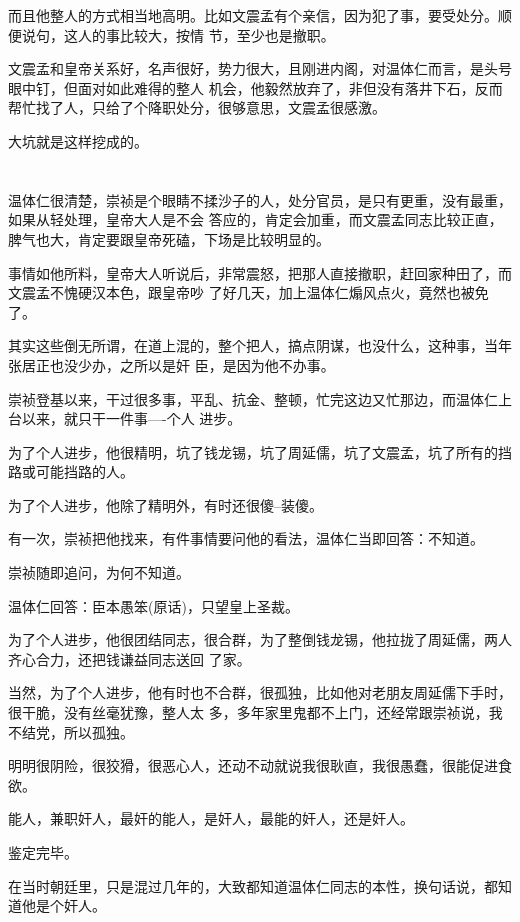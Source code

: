 \documentclass[11pt,a4paper,onecolumn]{article}
\begin{document}
而且他整人的方式相当地高明。比如文震孟有个亲信，因为犯了事，要受处分。顺便说句，这人的事比较大，按情
节，至少也是撤职。

文震孟和皇帝关系好，名声很好，势力很大，且刚进内阁，对温体仁而言，是头号眼中钉，但面对如此难得的整人
机会，他毅然放弃了，非但没有落井下石，反而帮忙找了人，只给了个降职处分，很够意思，文震孟很感激。

大坑就是这样挖成的。

\section[\thesection]{}

温体仁很清楚，崇祯是个眼睛不揉沙子的人，处分官员，是只有更重，没有最重，如果从轻处理，皇帝大人是不会
答应的，肯定会加重，而文震孟同志比较正直，脾气也大，肯定要跟皇帝死磕，下场是比较明显的。

事情如他所料，皇帝大人听说后，非常震怒，把那人直接撤职，赶回家种田了，而文震孟不愧硬汉本色，跟皇帝吵
了好几天，加上温体仁煽风点火，竟然也被免了。

其实这些倒无所谓，在道上混的，整个把人，搞点阴谋，也没什么，这种事，当年张居正也没少办，之所以是奸
臣，是因为他不办事。

崇祯登基以来，干过很多事，平乱、抗金、整顿，忙完这边又忙那边，而温体仁上台以来，就只干一件事----个人
进步。

为了个人进步，他很精明，坑了钱龙锡，坑了周延儒，坑了文震孟，坑了所有的挡路或可能挡路的人。

为了个人进步，他除了精明外，有时还很傻--装傻。

有一次，崇祯把他找来，有件事情要问他的看法，温体仁当即回答：不知道。

崇祯随即追问，为何不知道。

温体仁回答：臣本愚笨(原话)，只望皇上圣裁。

为了个人进步，他很团结同志，很合群，为了整倒钱龙锡，他拉拢了周延儒，两人齐心合力，还把钱谦益同志送回
了家。

当然，为了个人进步，他有时也不合群，很孤独，比如他对老朋友周延儒下手时，很干脆，没有丝毫犹豫，整人太
多，多年家里鬼都不上门，还经常跟崇祯说，我不结党，所以孤独。

明明很阴险，很狡猾，很恶心人，还动不动就说我很耿直，我很愚蠢，很能促进食欲。

能人，兼职奸人，最奸的能人，是奸人，最能的奸人，还是奸人。

鉴定完毕。

在当时朝廷里，只是混过几年的，大致都知道温体仁同志的本性，换句话说，都知道他是个奸人。
\end{document}
